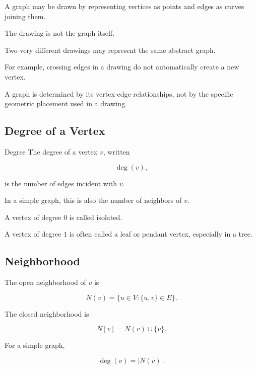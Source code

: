 A graph may be drawn by representing vertices as points and edges as
curves joining them.

The drawing is not the graph itself.

Two very different drawings may represent the same abstract graph.

For example, crossing edges in a drawing do not automatically create a
new vertex.

\begin{importantbox}
A graph is determined by its vertex-edge relationships, not by the
specific geometric placement used in a drawing.
\end{importantbox}

\subsection{Degree of a Vertex}
\label{subsec:degree-of-vertex}

\begin{definitionbox}{Degree}
The degree of a vertex \(v\), written

\[
\boxed{
\deg(v),
}
\]

is the number of edges incident with \(v\).
\end{definitionbox}

In a simple graph, this is also the number of neighbors of \(v\).

A vertex of degree \(0\) is called isolated.

A vertex of degree \(1\) is often called a leaf or pendant vertex,
especially in a tree.

\subsection{Neighborhood}
\label{subsec:graph-neighborhood}

The open neighborhood of \(v\) is

\[
\boxed{
N(v)
=
\{u\in V:\{u,v\}\in E\}.
}
\]

The closed neighborhood is

\[
\boxed{
N[v]
=
N(v)\cup\{v\}.
}
\]

For a simple graph,

\[
\boxed{
\deg(v)=|N(v)|.
}
\]

